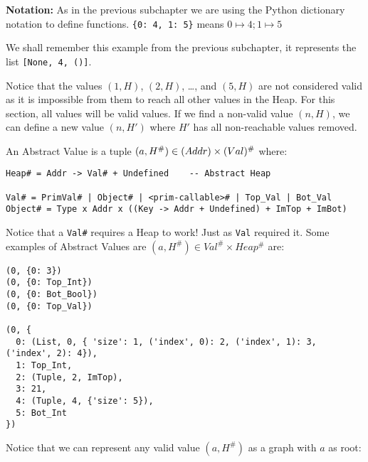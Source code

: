 \textbf{Notation:} As in the previous subchapter we are using the Python
dictionary notation to define functions. \texttt{\{0:\ 4,\ 1:\ 5\}}
means \(0 \mapsto 4; 1 \mapsto 5\)

We shall remember this example from the previous subchapter, it
represents the list \texttt{{[}None,\ 4,\ (){]}}.

Notice that the values \((1, H)\), \((2, H)\), \ldots{}, and \((5, H)\)
are not considered valid as it is impossible from them to reach all
other values in the Heap. For this section, all values will be valid
values. If we find a non-valid value \((n, H)\), we can define a new
value \((n, H')\) where \(H'\) has all non-reachable values removed.

{}

An Abstract Value is a tuple
\((a, H^\#) \in \text(Addr) \times \text(Val)^\#\) where:

\begin{verbatim}
Heap# = Addr -> Val# + Undefined    -- Abstract Heap

Val# = PrimVal# | Object# | <prim-callable># | Top_Val | Bot_Val
Object# = Type x Addr x ((Key -> Addr + Undefined) + ImTop + ImBot)
\end{verbatim}

Notice that a \texttt{Val\#} requires a Heap to work! Just as
\texttt{Val} required it. Some examples of Abstract Values are
\((a, H^\#) \in Val^\# \times Heap^\#\) are:

\begin{verbatim}
(0, {0: 3})
(0, {0: Top_Int})
(0, {0: Bot_Bool})
(0, {0: Top_Val})

(0, {
  0: (List, 0, { 'size': 1, ('index', 0): 2, ('index', 1): 3, ('index', 2): 4}),
  1: Top_Int,
  2: (Tuple, 2, ImTop),
  3: 21,
  4: (Tuple, 4, {'size': 5}),
  5: Bot_Int
})
\end{verbatim}

Notice that we can represent any valid value \((a, H^\#)\) as a graph
with \(a\) as root:

{}

